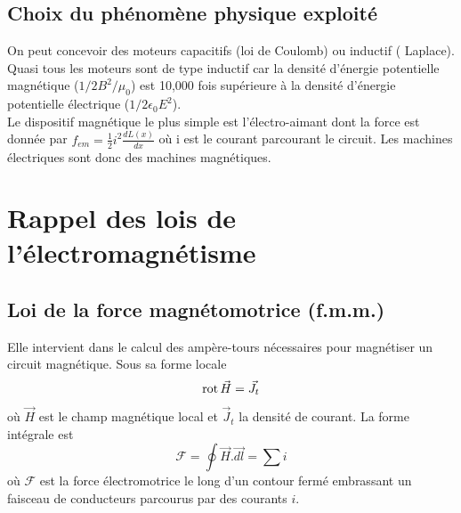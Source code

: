 	\subsection{Choix du phénomène physique exploité}
	On peut concevoir des moteurs capacitifs (loi de Coulomb) ou inductif (
	Laplace). Quasi tous les moteurs sont de type inductif car la densité 
	d'énergie potentielle magnétique ($1/2B^2/\mu_0$) est 10,000 fois 
	supérieure à la densité d'énergie potentielle électrique ($1/2\epsilon_0
	E^2$).\\
	Le dispositif magnétique le plus simple est l'électro-aimant dont 
	la force est donnée par $f_{em} = \frac{1}{2} i^2\frac{dL(x)}{dx}$ où i 
	est le courant parcourant le circuit. Les machines électriques sont donc des machines magnétiques. 
	
	
	
\section{Rappel des lois de l'électromagnétisme}
	\subsection{Loi de la force magnétomotrice (f.m.m.)}
	Elle intervient dans le calcul des ampère-tours nécessaires pour 
	magnétiser un circuit magnétique. Sous sa forme locale 
	\begin{equation}
	\rot \vec{H} = \vec{J}_t
	\end{equation}
	où $\vec{H}$ est le champ magnétique local et $\vec{J}_t$ la 
	densité de courant. La forme intégrale est 
	\begin{equation}
	\mathcal{F} = \oint \vec{H}.\vec{dl} = \sum i
	\label{eq:2.2}
	\end{equation}
	où $\mathcal{F}$ est la force électromotrice le long d'un contour 
	fermé embrassant un faisceau de conducteurs parcourus par des 
	courants $i$.
	
